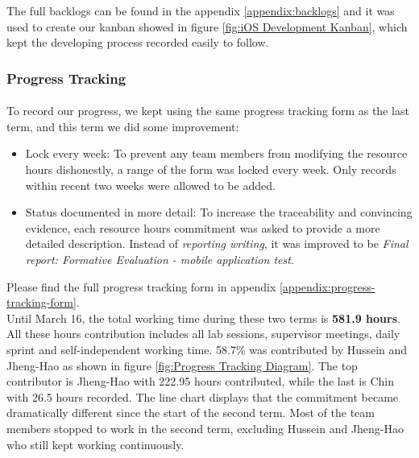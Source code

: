 \documentclass[12pt,a4paper]{article}
\begin{document}
          The full backlogs can be found in the appendix \ref{appendix:backlogs} and it was used to create our kanban showed in figure \ref{fig:iOS Development Kanban}, which kept the developing process recorded easily to follow.        
          
        \subsubsection{Progress Tracking}
          \paragraph{}To record our progress, we kept using the same progress tracking form as the last term, and this term we did some improvement:

          \begin{itemize}
            \item {Lock every week}: To prevent any team members from modifying the resource hours dishonestly, a range of the form was locked every week. Only records within recent two weeks were allowed to be added. 
            \item {Status documented in more detail}: To increase the traceability and convincing evidence, each resource hours commitment was asked to provide a more detailed description. Instead of {\it reporting writing}, it was improved to be {\it Final report: Formative Evaluation - mobile application test}.
          \end{itemize}

          Please find the full progress tracking form in appendix \ref{appendix:progress-tracking-form}.\\
          
          Until March 16, the total working time during these two terms is {\bf 581.9 hours}. All these hours contribution includes all lab sessions, supervisor meetings, daily sprint and self-independent working time. 58.7\% was contributed by Hussein and Jheng-Hao as shown in figure \ref{fig:Progress Tracking Diagram}. The top contributor is Jheng-Hao with 222.95 hours contributed, while the last is Chin with 26.5 hours recorded. The line chart displays that the commitment became dramatically different since the start of the second term. Most of the team members stopped to work in the second term, excluding Hussein and Jheng-Hao who still kept working continuously.
          
\end{document}
